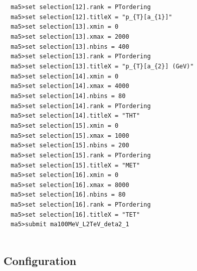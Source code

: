 \documentclass[a4paper, 10pt]{article}
\begin{document}
\texttt{ }\texttt{ }\texttt{ma5>set selection[12].rank = PTordering\\
}
\texttt{ }\texttt{ }\texttt{ma5>set selection[12].titleX = "p\_\{T\}[a\_\{1\}]"\\
}
\texttt{ }\texttt{ }\texttt{ma5>set selection[13].xmin = 0\\
}
\texttt{ }\texttt{ }\texttt{ma5>set selection[13].xmax = 2000\\
}
\texttt{ }\texttt{ }\texttt{ma5>set selection[13].nbins = 400\\
}
\texttt{ }\texttt{ }\texttt{ma5>set selection[13].rank = PTordering\\
}
\texttt{ }\texttt{ }\texttt{ma5>set selection[13].titleX = "p\_\{T\}[a\_\{2\}] (GeV)"\\
}
\texttt{ }\texttt{ }\texttt{ma5>set selection[14].xmin = 0\\
}
\texttt{ }\texttt{ }\texttt{ma5>set selection[14].xmax = 4000\\
}
\texttt{ }\texttt{ }\texttt{ma5>set selection[14].nbins = 80\\
}
\texttt{ }\texttt{ }\texttt{ma5>set selection[14].rank = PTordering\\
}
\texttt{ }\texttt{ }\texttt{ma5>set selection[14].titleX = "THT"\\
}
\texttt{ }\texttt{ }\texttt{ma5>set selection[15].xmin = 0\\
}
\texttt{ }\texttt{ }\texttt{ma5>set selection[15].xmax = 1000\\
}
\texttt{ }\texttt{ }\texttt{ma5>set selection[15].nbins = 200\\
}
\texttt{ }\texttt{ }\texttt{ma5>set selection[15].rank = PTordering\\
}
\texttt{ }\texttt{ }\texttt{ma5>set selection[15].titleX = "MET"\\
}
\texttt{ }\texttt{ }\texttt{ma5>set selection[16].xmin = 0\\
}
\texttt{ }\texttt{ }\texttt{ma5>set selection[16].xmax = 8000\\
}
\texttt{ }\texttt{ }\texttt{ma5>set selection[16].nbins = 80\\
}
\texttt{ }\texttt{ }\texttt{ma5>set selection[16].rank = PTordering\\
}
\texttt{ }\texttt{ }\texttt{ma5>set selection[16].titleX = "TET"\\
}
\texttt{ }\texttt{ }\texttt{ma5>submit ma100MeV\_L2TeV\_deta2\_1\\
}
\texttt{ }\texttt{ }\subsection{ Configuration}
\end{document}
